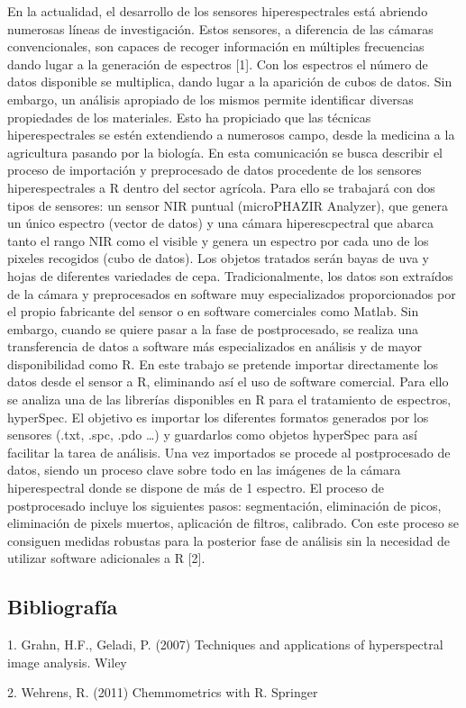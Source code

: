 En la actualidad, el desarrollo de los sensores hiperespectrales está abriendo numerosas líneas de investigación. Estos sensores, a diferencia de las cámaras convencionales, son capaces de recoger información en múltiples frecuencias dando lugar a la generación de espectros [1]. Con los espectros el número de datos disponible se multiplica, dando lugar a la aparición de cubos de datos. Sin embargo, un análisis apropiado de los mismos permite identificar diversas propiedades de los materiales. Esto ha propiciado que las técnicas hiperespectrales se estén extendiendo a numerosos campo, desde la medicina a la agricultura pasando por la biología.
En esta comunicación se busca describir el proceso de importación y preprocesado de datos procedente de los sensores hiperespectrales a R dentro del sector agrícola. Para ello se trabajará con dos tipos de sensores: un sensor NIR puntual (microPHAZIR Analyzer), que genera un único espectro (vector de datos) y una cámara hiperescpectral que abarca tanto el rango NIR como el visible y genera un espectro por cada uno de los pixeles recogidos (cubo de datos). Los objetos tratados serán bayas de uva y hojas de diferentes variedades de cepa.
Tradicionalmente, los datos son extraídos de la cámara y preprocesados en software muy especializados proporcionados por el propio fabricante del sensor o en software comerciales como Matlab. Sin embargo, cuando se quiere pasar a la fase de postprocesado, se realiza una transferencia de datos a software más especializados en análisis y de mayor disponibilidad como R. En este trabajo se pretende importar directamente los datos desde el sensor a R, eliminando así el uso de software comercial. Para ello se analiza una de las librerías disponibles en R para el tratamiento de espectros, hyperSpec. El objetivo es importar los diferentes formatos generados por los sensores (.txt, .spc, .pdo …) y guardarlos como objetos hyperSpec para así facilitar la tarea de análisis. Una vez importados se procede al postprocesado de datos, siendo un proceso clave sobre todo en las imágenes de la cámara hiperespectral donde se dispone de más de 1 espectro. El proceso de postprocesado incluye los siguientes pasos: segmentación, eliminación de picos, eliminación de pixels muertos, aplicación de filtros, calibrado. Con este proceso se consiguen medidas robustas para la posterior fase de análisis sin la necesidad de utilizar software adicionales a R [2]. \bigskip\subsection*{Bibliografía}

 1. Grahn, H.F., Geladi, P. (2007) Techniques and applications of hyperspectral image analysis. Wiley

2. Wehrens, R. (2011) Chemmometrics with R. Springer

%

%
